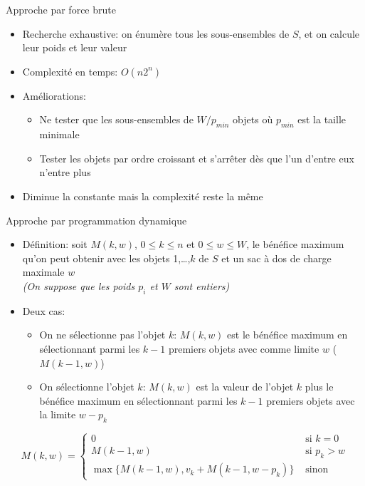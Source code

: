 \begin{frame}{Approche par force brute}

\begin{itemize}
\item Recherche exhaustive: on énumère tous les sous-ensembles de $S$, et on calcule leur poids et leur valeur
\item Complexité en temps: $O(n 2^n)$
\item Améliorations:
\begin{itemize}
\item Ne tester que les sous-ensembles de $W/p_{min}$ objets où
  $p_{min}$ est la taille minimale
\item Tester les objets par ordre croissant et s'arrêter dès que l'un
  d'entre eux n'entre plus
\end{itemize}
\item Diminue la constante mais la complexité reste la même
\end{itemize}

\end{frame}

\begin{frame}{Approche par programmation dynamique}

\begin{itemize}
\item Définition: soit $M(k,w)$, $0\leq k\leq n$ et $0\leq w\leq W$, le bénéfice
  maximum qu'on peut obtenir avec les objets 1,\ldots,$k$ de $S$ et
  un sac à dos de charge maximale $w$\\
{\it (On suppose que les poids $p_i$ et $W$ sont entiers)}
\item Deux cas:
\begin{itemize}
\item On ne sélectionne pas l'objet $k$: $M(k,w)$ est le bénéfice maximum
  en sélectionnant parmi les $k-1$ premiers objets avec
  comme limite $w$ ($M(k-1,w)$)
\item On sélectionne l'objet $k$: $M(k,w)$ est la valeur de l'objet
  $k$ plus le bénéfice maximum en sélectionnant parmi les $k-1$
  premiers objets avec la limite $w-p_k$
\end{itemize}
\end{itemize}

\[M(k,w)=\left\{\begin{array}{ll}
0 & \mbox{ si }k=0\\
M(k-1,w) & \mbox{ si } p_k>w\\
\max\{M(k-1,w),v_k+M(k-1,w-p_k)\} &  \mbox{ sinon}
\end{array}
\right.
\]
\label{part6:knapsack}
\end{frame}

